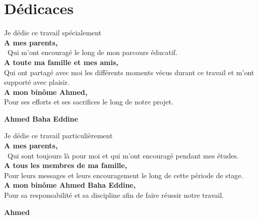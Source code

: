 



\chapter*{Dédicaces }

\begin{center}
	
	\begin{minipage}[c]{1\columnwidth}
		
		{\large 
			\vskip1cm
			
			\centering
			Je dédie ce travail spécialement \\\vskip0.5cm\textbf{A mes parents,}\\\ Qui m'ont encouragé le long de mon parcours éducatif.\\ \vskip0.5cm
			\textbf{A toute ma famille et mes amis,}\\Qui ont partagé avec moi les différents moments vécus durant ce travail et m'ont supporté avec plaisir.\\ \vskip0.5cm
			\textbf{A mon binôme Ahmed,}\\
			Pour ses efforts et ses sacrifices le long de notre projet.
			
		}
		
		
	\end{minipage}
	
\end{center}

\vskip1.5cm
\begin{flushright}\LARGE
	\bf{Ahmed Baha Eddine}
\end{flushright}
\clearpage
\begin{center}
	
	\begin{minipage}[c]{1\columnwidth}
		
		{\large 
			\vskip7cm
			
			\centering
			Je dédie ce travail particulièrement \\\vskip0.5cm\textbf{A mes parents,}\\\ Qui sont toujours là pour moi et qui m'ont encouragé pendant mes études.\\ \vskip0.5cm
			\textbf{A tous les membres de ma famille,}\\Pour leurs messages et leurs encouragement le long de cette période de stage.\\ \vskip0.5cm
			\textbf{A mon binôme Ahmed Baha Eddine,}\\
			Pour sa responsabilité et sa discipline afin de faire réussir notre travail.
		}
		
		
	\end{minipage}
	
\end{center}

\vskip1.5cm
\begin{flushright}\LARGE
	\bf{Ahmed}
\end{flushright}